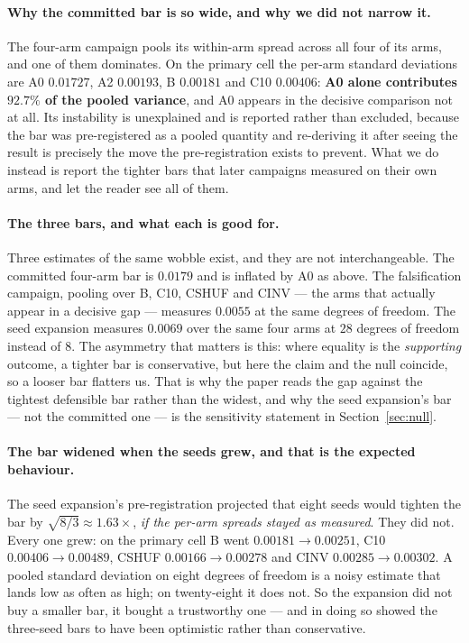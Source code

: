 \documentclass{article} %
\begin{document}
\paragraph{Why the committed bar is so wide, and why we did not narrow it.} The four-arm campaign
pools its within-arm spread across all four of its arms, and one of them dominates. On the primary
cell the per-arm standard deviations are A0 $0.01727$, A2 $0.00193$, B $0.00181$ and C10 $0.00406$:
\textbf{A0 alone contributes $92.7\%$ of the pooled variance}, and A0 appears in the decisive
comparison not at all. Its instability is unexplained and is reported rather than excluded, because
the bar was pre-registered as a pooled quantity and re-deriving it after seeing the result is
precisely the move the pre-registration exists to prevent. What we do instead is report the tighter
bars that later campaigns measured on their own arms, and let the reader see all of them.

\paragraph{The three bars, and what each is good for.} Three estimates of the same wobble exist,
and they are not interchangeable. The committed four-arm bar is $0.0179$ and is inflated by A0 as
above. The falsification campaign, pooling over B, C10, CSHUF and CINV --- the arms that actually
appear in a decisive gap --- measures $0.0055$ at the same degrees of freedom. The seed expansion
measures $0.0069$ over the same four arms at $28$ degrees of freedom instead of $8$. The asymmetry
that matters is this: where equality is the \emph{supporting} outcome, a tighter bar is
conservative, but here the claim and the null coincide, so a looser bar flatters us. That is why the
paper reads the gap against the tightest defensible bar rather than the widest, and why the seed
expansion's bar --- not the committed one --- is the sensitivity statement in Section~\ref{sec:null}.

\paragraph{The bar widened when the seeds grew, and that is the expected behaviour.} The seed
expansion's pre-registration projected that eight seeds would tighten the bar by
$\sqrt{8/3} \approx 1.63\times$, \emph{if the per-arm spreads stayed as measured}. They did not.
Every one grew: on the primary cell B went $0.00181 \rightarrow 0.00251$, C10
$0.00406 \rightarrow 0.00489$, CSHUF $0.00166 \rightarrow 0.00278$ and CINV
$0.00285 \rightarrow 0.00302$. A pooled standard deviation on eight degrees of freedom is a noisy
estimate that lands low as often as high; on twenty-eight it does not. So the expansion did not buy
a smaller bar, it bought a trustworthy one --- and in doing so showed the three-seed bars to have
been optimistic rather than conservative.
\end{document}
